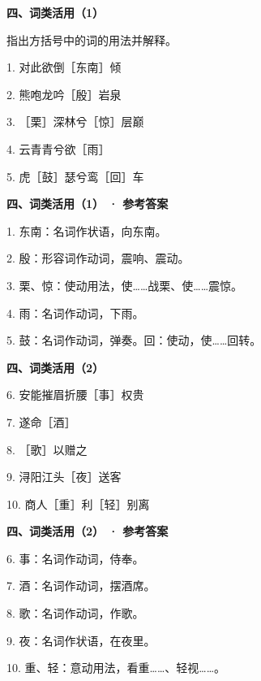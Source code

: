 \documentclass[UTF8,10pt,aspectratio=169]{ctexbeamer}
\newcommand{\PageHeading}[1]{\begin{center}{\Large\bfseries #1}\end{center}\vspace{0.2cm}}
\begin{document}
\begin{frame}
\PageHeading{四、词类活用（1）}
指出方括号中的词的用法并解释。\par\vspace{0.23cm}
1. 对此欲倒［东南］倾\par\vspace{0.23cm}
2. 熊咆龙吟［殷］岩泉\par\vspace{0.23cm}
3. ［栗］深林兮［惊］层巅\par\vspace{0.23cm}
4. 云青青兮欲［雨］\par\vspace{0.23cm}
5. 虎［鼓］瑟兮鸾［回］车\par\vspace{0.23cm}
\end{frame}
\begin{frame}
\PageHeading{四、词类活用（1） · 参考答案}
1. 东南：名词作状语，向东南。\par\vspace{0.23cm}
2. 殷：形容词作动词，震响、震动。\par\vspace{0.23cm}
3. 栗、惊：使动用法，使……战栗、使……震惊。\par\vspace{0.23cm}
4. 雨：名词作动词，下雨。\par\vspace{0.23cm}
5. 鼓：名词作动词，弹奏。回：使动，使……回转。\par\vspace{0.23cm}
\end{frame}
\begin{frame}
\PageHeading{四、词类活用（2）}
6. 安能摧眉折腰［事］权贵\par\vspace{0.23cm}
7. 遂命［酒］\par\vspace{0.23cm}
8. ［歌］以赠之\par\vspace{0.23cm}
9. 浔阳江头［夜］送客\par\vspace{0.23cm}
10. 商人［重］利［轻］别离\par\vspace{0.23cm}
\end{frame}
\begin{frame}
\PageHeading{四、词类活用（2） · 参考答案}
6. 事：名词作动词，侍奉。\par\vspace{0.23cm}
7. 酒：名词作动词，摆酒席。\par\vspace{0.23cm}
8. 歌：名词作动词，作歌。\par\vspace{0.23cm}
9. 夜：名词作状语，在夜里。\par\vspace{0.23cm}
10. 重、轻：意动用法，看重……、轻视……。\par\vspace{0.23cm}
\end{frame}
\end{document}
